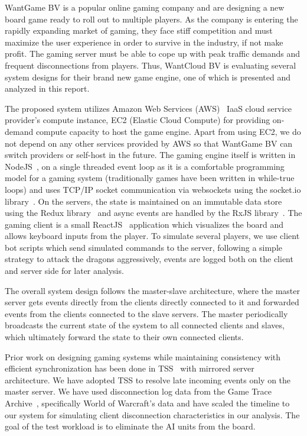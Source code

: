 \documentclass[a4paper]{IEEEtran}
\begin{document}
  WantGame BV is a popular online gaming company and are designing a new board game ready to roll out to multiple players. As the company is entering the rapidly expanding market of gaming, they face stiff competition and must maximize the user experience in order to survive in the industry, if not make profit. The gaming server must be able to cope up with peak traffic demands and frequent disconnections from players. Thus, WantCloud BV is evaluating several system designs for their brand new game engine, one of which is presented and analyzed in this report.
  
  The proposed system utilizes Amazon Web Services (AWS)~\cite{aws} IaaS cloud service provider's compute instance, EC2 (Elastic Cloud Compute) for providing on-demand compute capacity to host the game engine.
  Apart from using EC2, we do not depend on any other services provided by AWS so that WantGame BV can switch providers or self-host in the future. The gaming engine itself is written in NodeJS~\cite{nodejs}, on a single threaded event loop as it is a comfortable programming model for a gaming system (traditionally games have been written in while-true loops) and uses TCP/IP socket communication via websockets using the socket.io library~\cite{socket.io}. On the servers, the state is maintained on an immutable data store using the Redux library~\cite{redux} and async events are handled by the RxJS library~\cite{rxjs}. The gaming client is a small ReactJS~\cite{ReactJS} application which visualizes the board and allows keyboard inputs from the player. To simulate several players, we use client bot scripts which send simulated commands to the server, following a simple strategy to attack the dragons aggressively, events are logged both on the client and server side for later analysis.
  
  The overall system design follows the master-slave architecture, where the master server gets events directly from the clients directly connected to it and forwarded events from the clients connected to the slave servers. The master periodically broadcasts the current state of the system to all connected clients and slaves, which ultimately forward the state to their own connected clients.

  Prior work on designing gaming systems while maintaining consistency with efficient synchronization has been done in TSS~\cite{cronin2004efficient} with mirrored server architecture. We have adopted TSS to resolve late incoming events only on the master server. We have used disconnection log data from the Game Trace Archive~\cite{guo2012game}, specifically World of Warcraft's data and have scaled the timeline to our system for simulating client disconnection characteristics in our analysis. The goal of the test workload is to eliminate the AI units from the board.
  
\end{document}
